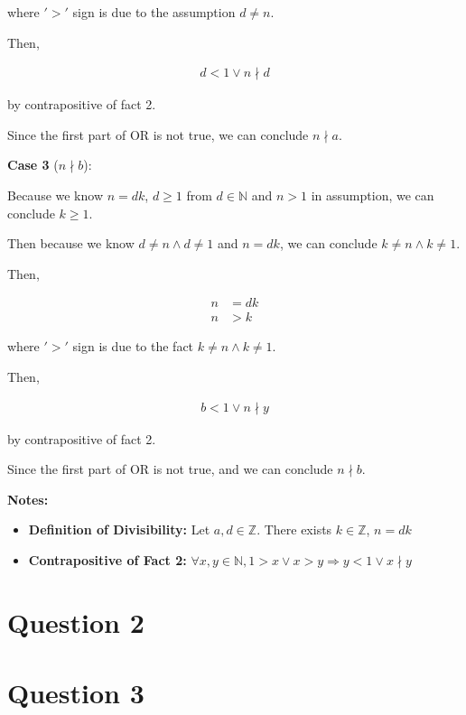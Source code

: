 \documentclass[12pt]{article}
\begin{document}
\begin{enumerate}
\begin{mdframed}
        where $'>'$ sign is due to the assumption $d \neq n$.

        \bigskip

        Then,

        \begin{align}
            d < 1 \lor n \nmid d
        \end{align}

        by contrapositive of fact 2.

        \bigskip

        Since the first part of OR is not true, we can conclude $n \nmid a$.

        \bigskip

        \textbf{Case 3} ($n \nmid b$):

        Because we know $n = dk$, $d \geq 1$ from $d \in \mathbb{N}$ and $n > 1$ in
        assumption, we can conclude $k \geq 1$.

        \bigskip

        Then because we know $d \neq n \land d \neq 1$ and $n = dk$, we can conclude
        $k \neq n \land k \neq 1$.

        Then,

        \begin{align}
            n &= dk\\
            n &> k
        \end{align}

        where $'>'$ sign is due to the fact $k \neq n \land k \neq 1$.

        \bigskip

        Then,

        \begin{align}
            b < 1 \lor n \nmid y
        \end{align}

        by contrapositive of fact 2.

        \bigskip

        Since the first part of OR is not true, and we can conclude $n \nmid b$.

    \end{mdframed}

    \textbf{Notes:}
    \begin{itemize}
        \item \textbf{Definition of Divisibility:} Let $a,d \in \mathbb{Z}$. There exists $k \in \mathbb{Z}$, $n = dk$
        \item \textbf{Contrapositive of Fact 2:} $\forall x,y \in \mathbb{N}, 1 > x \lor x > y \Rightarrow y < 1 \lor x \nmid y$

    \end{itemize}


\end{enumerate}

\section*{Question 2}

\section*{Question 3}
\end{document}
